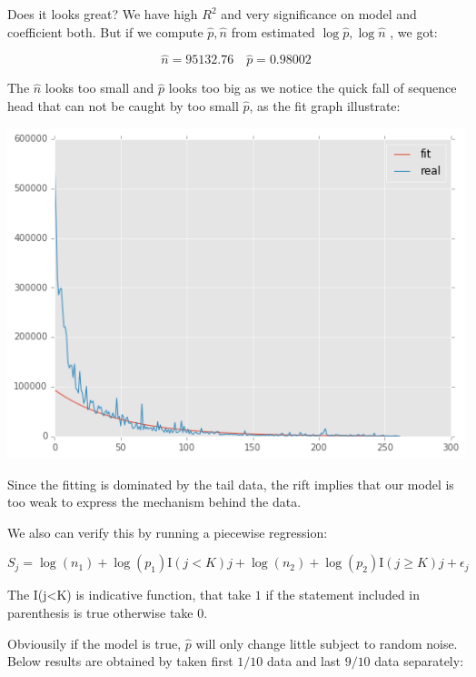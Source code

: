 \documentclass{article}
\begin{document}
Does it looks great? We have high $R^2$ and very significance on model and coefficient both. But if we compute 
$\hat{p},\hat{n}$ from  estimated $\log{\hat{p}}, \log{\hat{n}}$ , we got:

\[
\hat{n} = 95132.76 \quad \hat{p} = 0.98002
\]

The $\hat{n}$ looks too small and $\hat{p}$ looks too big as we notice the quick fall of sequence head that
can not be caught by too small $\hat{p}$, as the fit graph illustrate:

\includegraphics[scale=0.55]{simple-fit.png}

Since the fitting is dominated by the tail data, the rift implies that our model is too weak to express 
the mechanism behind the data.

We also can verify this by running a piecewise regression:

\[
S_j = \log(n_1) +  \log(p_1) \mathrm{I}(j<K) j + \log(n_2) + \log(p_2) \mathrm{I}(j \ge K)j + \epsilon_j
\]

The I(j<K) is indicative function, that take $1$ if the statement included in parenthesis is true otherwise take 0.

Obviousily if the model is true, $\hat{p}$ will only change little subject to random noise. 
Below results are obtained by taken first $1/10$ data and last $9/10$ data separately:
\end{document}
